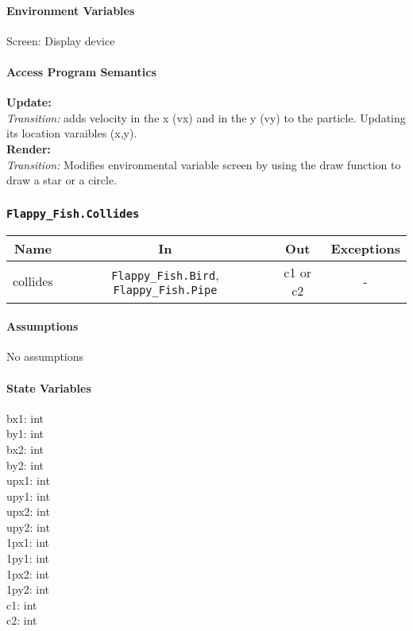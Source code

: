 \documentclass[11pt, oneside]{article}   	%
\begin{document}
\paragraph{Environment Variables}
Screen: Display device\\



\paragraph{Access Program Semantics} 
 \textbf{Update:}  \\
 \textit{Transition:} adds velocity in the x (vx) and in the y (vy) to the particle. Updating its location varaibles (x,y).\\
 \textbf{Render:}  \\
 \textit{Transition:} Modifies environmental variable screen by using the draw function to draw a star or a circle.\\

\subsubsection{\texttt{Flappy\_Fish.Collides}}



\begin{center}
\begin{tabular}{ |c|c|c|c| } 
 \hline
 Name & In & Out & Exceptions \\ 
 \hline \hline
 collides & \texttt{Flappy\_Fish.Bird}, \texttt{Flappy\_Fish.Pipe} & c1 or c2 & - \\ 

 \hline
\end{tabular}
\end{center}

\paragraph{Assumptions}
No assumptions

\paragraph{State Variables}
bx1: int\\
by1: int \\
bx2: int \\
by2: int \\
upx1: int\\
upy1: int \\
upx2: int \\
upy2: int \\
1px1: int \\
1py1: int \\
1px2: int \\
1py2: int \\
c1: int \\
c2: int \\
\end{document}
